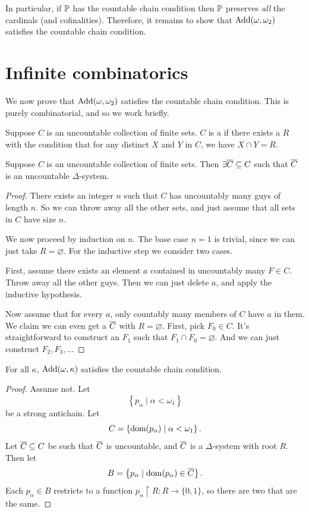 In particular, if $\mathbb P$ has the countable chain condition then $\mathbb P$ preserves \emph{all} the cardinals (and cofinalities).
Therefore, it remains to show that $\operatorname{Add}(\omega, \omega_2)$ satisfies the countable chain condition.

\section{Infinite combinatorics}
We now prove that $\operatorname{Add}(\omega, \omega_2)$ satisfies the countable chain condition.
This is purely combinatorial, and so we work briefly.

\begin{definition}
	Suppose $C$ is an uncountable collection of finite sets.
	$C$ is a  if there exists a  $R$
	with the condition that for any distinct $X$ and $Y$
	in $C$, we have $X \cap Y = R$.
\end{definition}

\begin{lemma}
	 Suppose $C$ is an uncountable collection of finite sets.
	Then $\exists \overline C \subseteq C$ such that $\overline C$ is an uncountable $\Delta$-system.
\end{lemma}
\begin{proof}
	There exists an integer $n$ such that $C$ has uncountably many guys of length $n$.
	So we can throw away all the other sets, and just assume that all sets in $C$ have size $n$.

	We now proceed by induction on $n$.
	The base case $n=1$ is trivial, since we can just take $R = \varnothing$.
	For the inductive step we consider two cases.

	First, assume there exists an element $a$ contained in uncountably many $F \in C$.
	Throw away all the other guys.
	Then we can just delete $a$, and apply the inductive hypothesis.

	Now assume that for every $a$, only countably many members of $C$ have $a$ in them.
	We claim we can even get a $\overline C$ with $R = \varnothing$.
	First, pick $F_0 \in C$.
	It's straightforward to construct an $F_1$ such that $F_1 \cap F_0 = \varnothing$.
	And we can just construct $F_2, F_3, \dots$
\end{proof}

\begin{lemma}
	For all $\kappa$, $\operatorname{Add}(\omega, \kappa)$ satisfies the countable chain condition.
\end{lemma}
\begin{proof}
	Assume not. Let
	\[ \left\{ p_\alpha \mid \alpha < \omega_1 \right\} \]
	be a strong antichain.  Let
	\[ C = \left\{ \operatorname{dom}(p_\alpha) \mid \alpha < \omega_1 \right\}. \]
	Let $\overline C \subseteq C$ be such that $\overline C$ is uncountable, and $\overline C$ is a $\Delta$-system with root $R$.
	Then let
	\[ B = \left\{ p_\alpha \mid \operatorname{dom}(p_\alpha) \in \overline C \right\}. \]
	Each $p_\alpha \in B$ restricts to a function $p_\alpha \restriction R \colon R \to \{0,1\}$,
	so there are two that are the same.
\end{proof}

